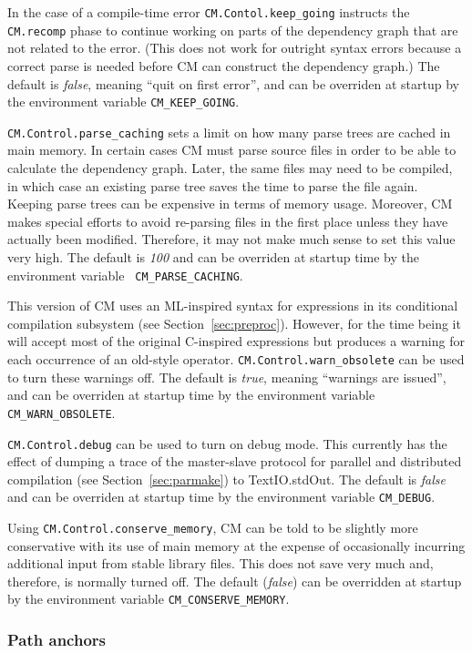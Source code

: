 \documentclass[titlepage,letterpaper]{article}
\begin{document}
In the case of a compile-time error {\tt CM.Contol.keep\_going}
instructs the {\tt CM.recomp} phase to continue working on parts of
the dependency graph that are not related to the error.  (This does
not work for outright syntax errors because a correct parse is needed
before CM can construct the dependency graph.)  The default is {\em
false}, meaning ``quit on first error'', and can be overriden at
startup by the environment variable {\tt CM\_KEEP\_GOING}.

{\tt CM.Control.parse\_caching} sets a limit on how many parse trees
are cached in main memory.  In certain cases CM must parse source
files in order to be able to calculate the dependency graph.  Later,
the same files may need to be compiled, in which case an existing
parse tree saves the time to parse the file again.  Keeping parse
trees can be expensive in terms of memory usage.  Moreover, CM makes
special efforts to avoid re-parsing files in the first place unless
they have actually been modified.  Therefore, it may not make much
sense to set this value very high.  The default is {\em 100} and can
be overriden at startup time by the environment variable {\tt
CM\_PARSE\_CACHING}.

This version of CM uses an ML-inspired syntax for expressions in its
conditional compilation subsystem (see Section~\ref{sec:preproc}).
However, for the time being it will accept most of the original
C-inspired expressions but produces a warning for each occurrence of
an old-style operator. {\tt CM.Control.warn\_obsolete} can be used to
turn these warnings off. The default is {\em true}, meaning ``warnings
are issued'', and can be overriden at startup time by the environment
variable {\tt CM\_WARN\_OBSOLETE}.

{\tt CM.Control.debug} can be used to turn on debug mode.  This
currently has the effect of dumping a trace of the master-slave
protocol for parallel and distributed compilation (see
Section~\ref{sec:parmake}) to TextIO.stdOut. The default is {\em
false} and can be overriden at startup time by the environment
variable {\tt CM\_DEBUG}.

Using {\tt CM.Control.conserve\_memory}, CM can be told to be slightly
more conservative with its use of main memory at the expense of
occasionally incurring additional input from stable library files.
This does not save very much and, therefore, is normally turned off.
The default ({\em false}) can be overridden at startup by the
environment variable {\tt CM\_CONSERVE\_MEMORY}.

\subsubsection*{Path anchors}
\end{document}
